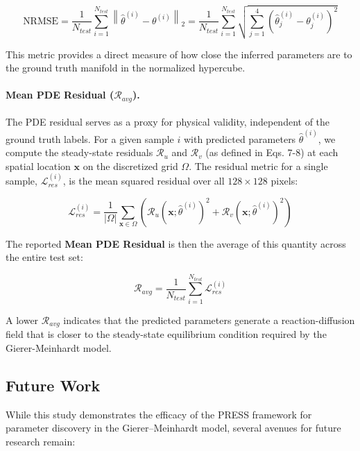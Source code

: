 \documentclass{article} %
\begin{document}
\begin{equation}
    \text{NRMSE} = \frac{1}{N_{test}} \sum_{i=1}^{N_{test}} \left\| \hat{\theta}^{(i)} - \theta^{(i)} \right\|_2 = \frac{1}{N_{test}} \sum_{i=1}^{N_{test}} \sqrt{\sum_{j=1}^4 \left( \hat{\theta}^{(i)}_j - \theta^{(i)}_j \right)^2}
\end{equation}

This metric provides a direct measure of how close the inferred parameters are to the ground truth manifold in the normalized hypercube.

\paragraph{Mean PDE Residual ($\mathcal{R}_{avg}$).}
The PDE residual serves as a proxy for physical validity, independent of the ground truth labels. For a given sample $i$ with predicted parameters $\hat{\theta}^{(i)}$, we compute the steady-state residuals $\mathcal{R}_u$ and $\mathcal{R}_v$ (as defined in Eqs. 7-8) at each spatial location $\mathbf{x}$ on the discretized grid $\Omega$. The residual metric for a single sample, $\mathcal{L}_{res}^{(i)}$, is the mean squared residual over all $128 \times 128$ pixels:

\begin{equation}
    \mathcal{L}_{res}^{(i)} = \frac{1}{|\Omega|} \sum_{\mathbf{x} \in \Omega} \left( \mathcal{R}_u(\mathbf{x}; \hat{\theta}^{(i)})^2 + \mathcal{R}_v(\mathbf{x}; \hat{\theta}^{(i)})^2 \right)
\end{equation}

The reported \textbf{Mean PDE Residual} is then the average of this quantity across the entire test set:

\begin{equation}
    \mathcal{R}_{avg} = \frac{1}{N_{test}} \sum_{i=1}^{N_{test}} \mathcal{L}_{res}^{(i)}
\end{equation}

A lower $\mathcal{R}_{avg}$ indicates that the predicted parameters generate a reaction-diffusion field that is closer to the steady-state equilibrium condition required by the Gierer-Meinhardt model.

\subsection{Future Work}

While this study demonstrates the efficacy of the PRESS framework for parameter discovery in the Gierer–Meinhardt model, several avenues for future research remain:
\end{document}

